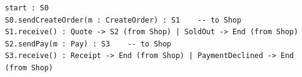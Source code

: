 \begin{lstlisting}[language={},basicstyle=\ttfamily\footnotesize,breaklines=true]
start : S0
S0.sendCreateOrder(m : CreateOrder) : S1    -- to Shop
S1.receive() : Quote -> S2 (from Shop) | SoldOut -> End (from Shop)
S2.sendPay(m : Pay) : S3    -- to Shop
S3.receive() : Receipt -> End (from Shop) | PaymentDeclined -> End (from Shop)
\end{lstlisting}
